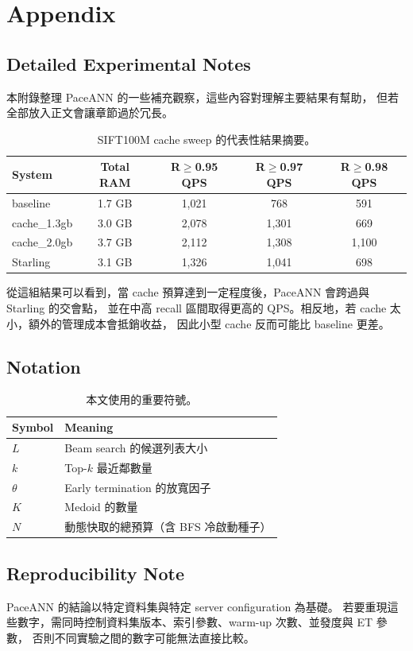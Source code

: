 \titleformat{\chapter}{\normalfont\huge\bfseries}{}{1em}{}

\chapter{Appendix}
\label{ch:appendix}

\section{Detailed Experimental Notes}

本附錄整理 PaceANN 的一些補充觀察，這些內容對理解主要結果有幫助，
但若全部放入正文會讓章節過於冗長。

\begin{table}[!ht]
  \centering
  \caption{SIFT100M cache sweep 的代表性結果摘要。}
  \label{tab:cache-sweep}
  \begin{tabular}{lcccc}
    \toprule
    System & Total RAM & R$\geq$0.95 QPS & R$\geq$0.97 QPS & R$\geq$0.98 QPS \\
    \midrule
    baseline & 1.7 GB & 1,021 & 768 & 591 \\
    cache\_1.3gb & 3.0 GB & 2,078 & 1,301 & 669 \\
    cache\_2.0gb & 3.7 GB & 2,112 & 1,308 & 1,100 \\
    Starling & 3.1 GB & 1,326 & 1,041 & 698 \\
    \bottomrule
  \end{tabular}
\end{table}

從這組結果可以看到，當 cache 預算達到一定程度後，PaceANN 會跨過與 Starling 的交會點，
並在中高 recall 區間取得更高的 QPS。相反地，若 cache 太小，額外的管理成本會抵銷收益，
因此小型 cache 反而可能比 baseline 更差。

\section{Notation}

\begin{table}[!ht]
  \centering
  \caption{本文使用的重要符號。}
  \label{tab:notation}
  \begin{tabular}{p{2.5cm} p{8.5cm}}
    \toprule
    Symbol & Meaning \\
    \midrule
    $L$ & Beam search 的候選列表大小 \\
    $k$ & Top-$k$ 最近鄰數量 \\
    $\theta$ & Early termination 的放寬因子 \\
    $K$ & Medoid 的數量 \\
    $N$ & 動態快取的總預算（含 BFS 冷啟動種子） \\
    \bottomrule
  \end{tabular}
\end{table}

\section{Reproducibility Note}

PaceANN 的結論以特定資料集與特定 server configuration 為基礎。
若要重現這些數字，需同時控制資料集版本、索引參數、warm-up 次數、並發度與 ET 參數，
否則不同實驗之間的數字可能無法直接比較。
